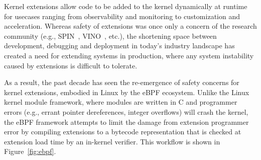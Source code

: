 



Kernel extensions allow code to be added to the kernel dynamically at
runtime for usecases ranging from observability and monitoring to
customization and acceleration.  Whereas safety of extensions was once
only a concern of the research community (e.g., SPIN~\cite{spin},
VINO~\cite{vino}, etc.), the shortening space between development,
debugging and deployment in today's industry landscape has created a
need for extending systems in production, where any system instability
caused by extensions is difficult to tolerate.

As a result, the past decade has seen the re-emergence of safety
concerns for kernel extensions, embodied in Linux by the eBPF
ecosystem.  Unlike the Linux kernel module framework, where modules
are written in C and programmer errors (e.g., errant pointer
dereferences, integer overflows) will crash the kernel, the eBPF
framework attempts to limit the damage from extension programmer error
by compiling extensions to a bytecode representation that is checked
at extension load time by an in-kernel verifier.  This workflow is
shown in Figure~\ref{fig:ebpf}.

